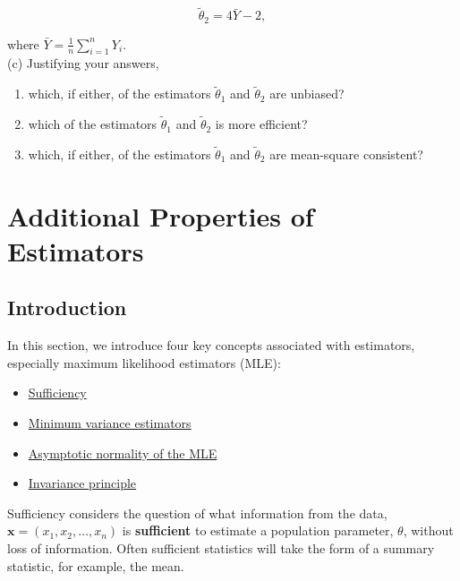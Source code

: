 \documentclass[
]{book}
\providecommand{\tightlist}{%
  \setlength{\itemsep}{0pt}\setlength{\parskip}{0pt}}
\begin{document}
\[\tilde{\theta}_2 = 4 \bar{Y} - 2,\]

where \(\bar{Y} = \frac{1}{n} \sum_{i=1}^n Y_i.\)\\
(c) Justifying your answers,

\begin{enumerate}
\def\labelenumi{\roman{enumi}.}
\tightlist
\item
  which, if either, of the estimators \(\tilde{\theta}_1\) and \(\tilde{\theta}_2\) are unbiased?\\
\item
  which of the estimators \(\tilde{\theta}_1\) and \(\tilde{\theta}_2\) is more efficient?\\
\item
  which, if either, of the estimators \(\tilde{\theta}_1\) and \(\tilde{\theta}_2\) are mean-square
  consistent?\\
\end{enumerate}

\hypertarget{MLEprop}{%
\chapter{Additional Properties of Estimators}\label{MLEprop}}

\hypertarget{MLEprop:intro}{%
\section{Introduction}\label{MLEprop:intro}}

In this section, we introduce four key concepts associated with estimators, especially maximum likelihood estimators (MLE):

\begin{itemize}
\tightlist
\item
  \protect\hyperlink{MLEprop:sufficient}{Sufficiency}
\item
  \protect\hyperlink{MLEprop:MVE}{Minimum variance estimators}
\item
  \protect\hyperlink{MLEprop:asymptotic}{Asymptotic normality of the MLE}\\
\item
  \protect\hyperlink{MLEprop:invariance}{Invariance principle}
\end{itemize}

Sufficiency considers the question of what information from the data, \(\mathbf{x} = (x_1,x_2,\ldots,x_n)\) is \textbf{sufficient} to estimate a population parameter, \(\theta\), without loss of information. Often sufficient statistics will take the form of a summary statistic, for example, the mean.
\end{document}
